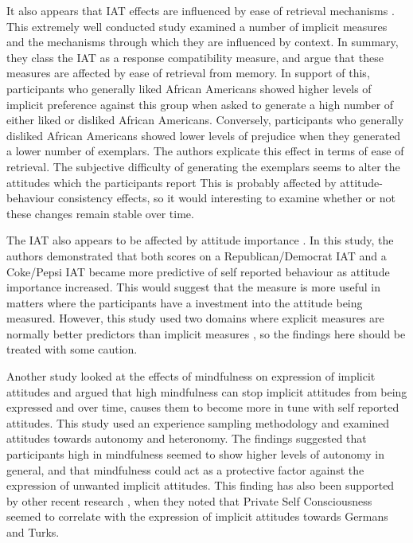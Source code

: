 It also appears that IAT effects are influenced by ease of retrieval mechanisms \cite{Gawronski2005}. This extremely well conducted study examined a number of implicit measures and the mechanisms through which they are influenced by context. In summary, they class the IAT as a response compatibility measure, and argue that these measures are affected by ease of retrieval from memory. In support of this, participants who generally liked African Americans showed higher levels of implicit preference against this group when asked to generate a high number of either liked or disliked African Americans. Conversely, participants who generally disliked African Americans showed lower levels of prejudice when they generated a lower number of exemplars. The authors explicate this effect in terms of ease of retrieval. The subjective difficulty of generating the exemplars seems to alter the attitudes which the participants report %
This is probably affected by attitude-behaviour consistency effects, so it would interesting to examine whether or not these changes remain stable over time.  

The IAT also appears to be affected by attitude importance \cite{Karpinski2005}. In this study, the authors demonstrated that both scores on a Republican/Democrat IAT and a Coke/Pepsi IAT became more predictive of self reported behaviour as attitude importance increased. This would suggest that the measure is more useful in matters where the participants have a investment into the attitude being measured. However, this study used two domains where explicit measures are normally better predictors than implicit measures \cite{Nosek2007d}, so the findings here should be treated with some caution. 

Another study \cite{Levesque2007} looked at the effects of mindfulness on expression of implicit attitudes and argued that high mindfulness can stop implicit attitudes from being expressed and over time, causes them to become more in tune with self reported attitudes. This study used an experience sampling methodology and examined attitudes towards autonomy and heteronomy. The findings suggested that participants high in mindfulness seemed to show higher levels of autonomy in general, and that mindfulness could act as a protective factor against the expression of unwanted implicit attitudes.  This finding has also been supported by other recent research \cite{Gschwendner2006}, when they noted that Private Self Consciousness seemed to correlate with the expression of implicit attitudes towards Germans and Turks. 



